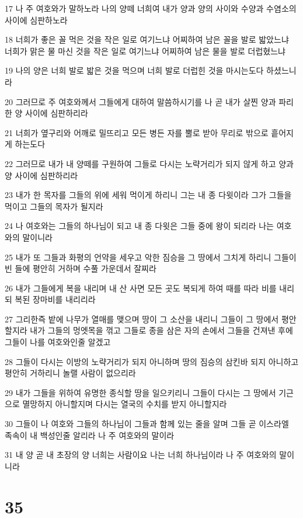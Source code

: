 \par 17 나 주 여호와가 말하노라 나의 양떼 너희여 내가 양과 양의 사이와 수양과 수염소의 사이에 심판하노라
\par 18 너희가 좋은 꼴 먹은 것을 작은 일로 여기느냐 어찌하여 남은 꼴을 발로 밟았느냐 너희가 맑은 물 마신 것을 작은 일로 여기느냐 어찌하여 남은 물을 발로 더럽혔느냐
\par 19 나의 양은 너희 발로 밟은 것을 먹으며 너희 발로 더럽힌 것을 마시는도다 하셨느니라
\par 20 그러므로 주 여호와께서 그들에게 대하여 말씀하시기를 나 곧 내가 살찐 양과 파리한 양 사이에 심판하리라
\par 21 너희가 옆구리와 어깨로 밀뜨리고 모든 병든 자를 뿔로 받아 무리로 밖으로 흩어지게 하는도다
\par 22 그러므로 내가 내 양떼를 구원하여 그들로 다시는 노략거리가 되지 않게 하고 양과 양 사이에 심판하리라
\par 23 내가 한 목자를 그들의 위에 세워 먹이게 하리니 그는 내 종 다윗이라 그가 그들을 먹이고 그들의 목자가 될지라
\par 24 나 여호와는 그들의 하나님이 되고 내 종 다윗은 그들 중에 왕이 되리라 나는 여호와의 말이니라
\par 25 내가 또 그들과 화평의 언약을 세우고 악한 짐승을 그 땅에서 그치게 하리니 그들이 빈 들에 평안히 거하며 수풀 가운데서 잘찌라
\par 26 내가 그들에게 복을 내리며 내 산 사면 모든 곳도 복되게 하여 때를 따라 비를 내리되 복된 장마비를 내리리라
\par 27 그리한즉 밭에 나무가 열매를 맺으며 땅이 그 소산을 내리니 그들이 그 땅에서 평안할지라 내가 그들의 멍엣목을 꺾고 그들로 종을 삼은 자의 손에서 그들을 건져낸 후에 그들이 나를 여호와인줄 알겠고
\par 28 그들이 다시는 이방의 노략거리가 되지 아니하며 땅의 짐승의 삼킨바 되지 아니하고 평안히 거하리니 놀랠 사람이 없으리라
\par 29 내가 그들을 위하여 유명한 종식할 땅을 일으키리니 그들이 다시는 그 땅에서 기근으로 멸망하지 아니할지며 다시는 열국의 수치를 받지 아니할지라
\par 30 그들이 나 여호와 그들의 하나님이 그들과 함께 있는 줄을 알며 그들 곧 이스라엘 족속이 내 백성인줄 알리라 나 주 여호와의 말이라
\par 31 내 양 곧 내 초장의 양 너희는 사람이요 나는 너희 하나님이라 나 주 여호와의 말이니라

\chapter{35}

